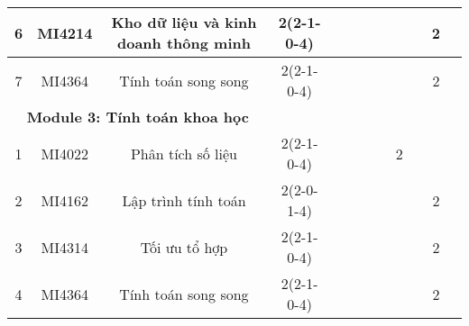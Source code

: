 \documentclass[12pt,a4paper]{report}
\begin{document}
\begin{landscape}
\begin{longtable}[c]{|c|c|c|c|c|c|c|c|c|c|c|c|}
        6                             & MI4214                          & Kho dữ liệu và kinh doanh thông minh                         & 2(2-1-0-4)                                                                           &             &             &             &             &             &             & 2           &             \\ \hline
        7                             & MI4364                          & Tính toán song song                                          & 2(2-1-0-4)                                                                           &             &             &             &             &             &             & 2           &             \\ \hline
        \multicolumn{3}{|c|}{\textbf{Module 3: Tính toán khoa học}}                                                                    &                                                                                      &             &             &             &             &             &             &             &             \\ \hline
        1                             & MI4022                          & Phân tích số liệu                                            & 2(2-1-0-4)                                                                           &             &             &             &             & 2           &             &             &             \\ \hline
        2                             & MI4162                          & Lập trình tính toán                                          & 2(2-0-1-4)                                                                           &             &             &             &             &             &             & 2           &             \\ \hline
        3                             & MI4314                          & Tối ưu tổ hợp                                                & 2(2-1-0-4)                                                                           &             &             &             &             &             &             & 2           &             \\ \hline
        4                             & MI4364                          & Tính toán song song                                          & 2(2-1-0-4)                                                                           &             &             &             &             &             &             & 2           &             \\ \hline

\end{longtable}
\end{landscape}
\end{document}
